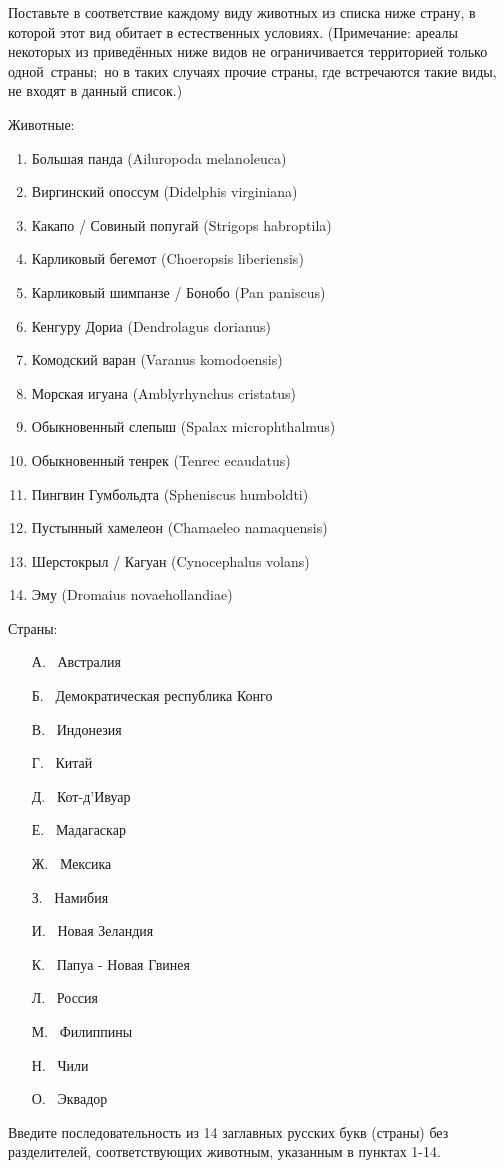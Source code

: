 
Поставьте в соответствие каждому виду животных из списка ниже страну, в которой этот вид обитает в естественных условиях. (Примечание: ареалы некоторых из приведённых ниже видов не ограничивается территорией только одной страны; но в таких случаях прочие страны, где встречаются такие виды, не входят в данный список.)

Животные:
\begin{enumerate}
    \item Большая панда (Ailuropoda melanoleuca)
    \item Виргинский опоссум (Didelphis virginiana)
    \item Какапо / Совиный попугай (Strigops habroptila)
    \item Карликовый бегемот (Choeropsis liberiensis)
    \item Карликовый шимпанзе / Бонобо (Pan paniscus)
    \item Кенгуру Дориа (Dendrolagus dorianus)
    \item Комодский варан (Varanus komodoensis)
    \item Морская игуана (Amblyrhynchus cristatus) 
    \item Обыкновенный слепыш (Spalax microphthalmus)
    \item Обыкновенный тенрек (Tenrec ecaudatus) 
    \item Пингвин Гумбольдта (Spheniscus humboldti)
    \item Пустынный хамелеон (Chamaeleo namaquensis)
    \item Шерстокрыл / Кагуан (Cynocephalus volans)
    \item Эму (Dromaius novaehollandiae)
\end{enumerate}

Страны:
\begin{enumerate}
    \item[А.] Австралия
    \item[Б.] Демократическая республика Конго
    \item[В.] Индонезия
    \item[Г.] Китай
    \item[Д.] Кот-д’Ивуар
    \item[Е.] Мадагаскар
    \item[Ж.] Мексика
    \item[З.] Намибия
    \item[И.] Новая Зеландия
    \item[К.] Папуа - Новая Гвинея
    \item[Л.] Россия 
    \item[М.] Филиппины
    \item[Н.] Чили
    \item[О.] Эквадор
\end{enumerate}

Введите последовательность из 14 заглавных русских букв (страны) без разделителей, соответствующих животным, указанным в пунктах 1-14. 

